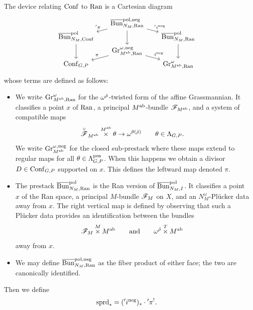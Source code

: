 \subsubsection{} The device relating $\mathrm{Conf}$ to $\mathrm{Ran}$ is a Cartesian diagram
\begin{equation}
\label{eqn:Conf_Ran_vac}
\begin{tikzcd}[
  column sep={7.5em,between origins},
  row sep={2em,between origins}
]
    & \Bunc_{N_M, \Ran}^{\pol, \neg} \arrow[dl, "\aph\pi" above left] \arrow[dr, "\aph i^\neg"] \arrow[dd] & \\
  \Bunc_{N_M, \Conf}^{\pol} \arrow[dd] & & \Bunc_{N_M, \Ran}^{\pol} \arrow[dd] \\
    & \Gr_{M^\ab, \Ran}^{\omega,\neg} \arrow[dl, "\pi" above left] \arrow[dr, "i^\neg"] &  \\
  \Conf_{G,P} & & \Gr^\omega_{M^\ab, \Ran}
\end{tikzcd}
\end{equation}
whose terms are defined as follows:
\begin{itemize}
    \item We write $\mathrm{Gr}_{M^{\mathrm{ab}},\mathrm{Ran}}^\omega$ for the $\omega^{\check{\rho}}$-twisted form of the affine Grassmannian. It classifies a point $x$ of $\mathrm{Ran}$, a principal $M^{\mathrm{ab}}$-bundle $\mathscr{F}_{M^{\mathrm{ab}}}$, and a system of compatible maps
        \[
        \overset{\circ}{\mathscr{F}}{}_{M^{\mathrm{ab}}} \overset{M^{\mathrm{ab}}}{\times} \theta \to \omega^{\theta({\check{\rho}})}
        \qquad
        \theta \in \Lambda_{G,P}.
        \]
    We write $\mathrm{Gr}_{M^{\mathrm{ab}}}^{\omega,\mathrm{neg}}$ for the closed sub-prestack where these maps extend to regular maps for all $\theta \in \Lambda_{G,P}^{\mathrm{pos}}$. When this happens we obtain a divisor $D \in \mathrm{Conf}_{G,P}$ supported on $x$. This defines the leftward map denoted $\pi$.
    \item The prestack $\overline{\mathrm{Bun}}_{N_M, \mathrm{Ran}}^{\mathrm{pol}}$ is the Ran version of $\overline{\mathrm{Bun}}_{N_M,I}^{\mathrm{pol}}$. It classifies a point $x$ of the Ran space, a principal $M$-bundle $\mathscr{F}_M$ on $X$, and an $N_M^\omega$-Pl\"ucker data away from $x$. The right vertical map is defined by observing that such a Pl\"ucker data provides an identification between the bundles
        \[
        \mathscr{F}_M \overset{M}{\times} M^{\mathrm{ab}}
        \qquad  \text{and} \qquad
        \omega^{\check{\rho}} \overset{T}{\times} M^{\mathrm{ab}}
        \]
    away from $x$.
    \item We may define $\overline{\mathrm{Bun}}_{N_M, \mathrm{Ran}}^{\mathrm{pol}, \mathrm{neg}}$ as the fiber product of either face; the two are canonically identified.
\end{itemize}
Then we define
  \[\mathrm{sprd}_* = ({'} i^{\mathrm{neg}})_* \cdot {'}\pi^!.\]


